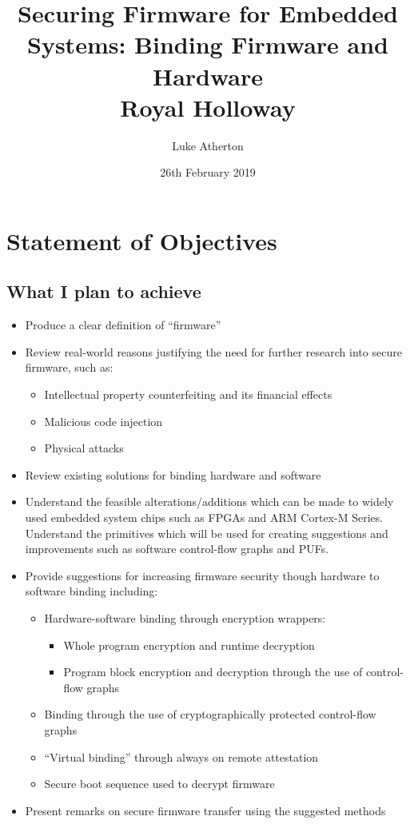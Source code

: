 \documentclass[10pt]{report}
\title{
	{Securing Firmware for Embedded Systems: Binding Firmware and Hardware}\\
	{\large Royal Holloway}\\
}
\author{Luke Atherton}
\date{26th February 2019}
\begin{document}
\maketitle

\chapter*{Statement of Objectives}

\section*{What I plan to achieve}
\begin{itemize}
	\item Produce a clear definition of ``firmware''
	\item Review real-world reasons justifying the need for further research into secure firmware, such as:
	\begin{itemize}
		\item Intellectual property counterfeiting and its financial effects 
		\item Malicious code injection
		\item Physical attacks
	\end{itemize}
	\item Review existing solutions for binding hardware and software
	\item Understand the feasible alterations/additions which can be made to widely used embedded system chips such as FPGAs and ARM Cortex-M Series. Understand the primitives which will be used for creating suggestions and improvements such as software control-flow graphs and PUFs.
	\item Provide suggestions for increasing firmware security though hardware to software binding including:
	\begin{itemize}
		\item Hardware-software binding through encryption wrappers:
		\begin{itemize}
			\item Whole program encryption and runtime decryption
			\item Program block encryption and decryption through the use of control-flow graphs
		\end{itemize}
		\item Binding through the use of cryptographically protected control-flow graphs
		\item ``Virtual binding'' through always on remote attestation 
		\item Secure boot sequence used to decrypt firmware
	\end{itemize}
	\item Present remarks on secure firmware transfer using the suggested methods
\end{itemize}
\end{document}
